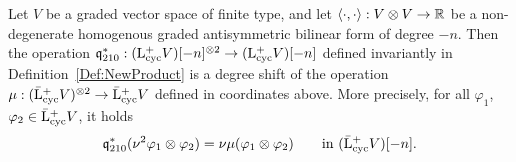 \documentclass[\MainFolder/Text.tex]{subfiles}
\begin{document}
\begin{Proposition}\label{Prop:EqOfDefCool}
Let $V$ be a graded vector space of finite type, and let $\langle \cdot,\cdot\rangle: V\otimes V \rightarrow \mathbb{R}$ be a non-degenerate homogenous graded antisymmetric bilinear form of degree $-n$. Then the operation $\mathfrak{q}_{210}^*: (\mathrm{L}^+_{\mathrm{cyc}} V)[-n]^{\otimes 2} \rightarrow (\mathrm{L}^+_{\mathrm{cyc}} V)[-n]$ defined invariantly in Definition~\ref{Def:NewProduct} is a degree shift of the operation $\mu: (\bar{\mathrm{L}}^+_{\mathrm{cyc}} V)^{\otimes 2} \rightarrow \bar{\mathrm{L}}^+_{\mathrm{cyc}} V$ defined in coordinates above. More precisely, for all $\varphi_1$, $\varphi_2 \in \bar{\mathrm{L}}^+_{\mathrm{cyc}} V$, it holds
\[ \mathfrak{q}_{210}^*(\mathbb{\nu}^2 \varphi_1 \otimes \varphi_2) = \mathbb{\nu} \mu(\varphi_1 \otimes \varphi_2)\qquad\text{in }(\bar{\mathrm{L}}^+_{\mathrm{cyc}} V)[-n].\]
\end{Proposition}
\end{document}
